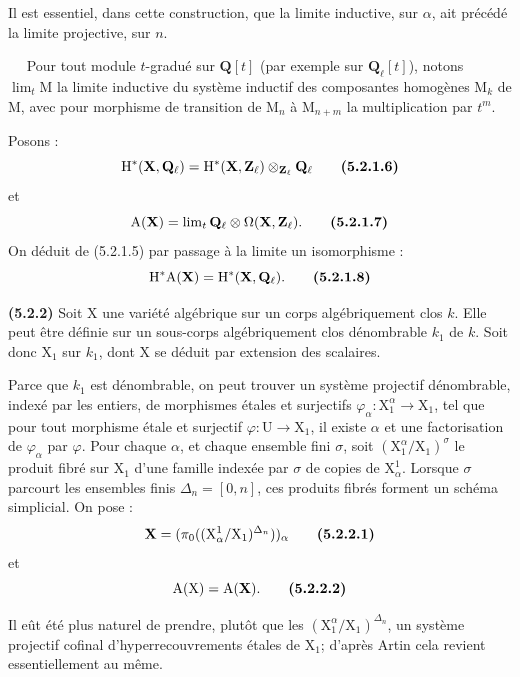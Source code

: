 \documentclass[11pt,leqno]{article}
\newcommand{\Page}[1]{\ifvmode\noindent\else\unskip\ \fi{\footnotesize\textcolor{gray}{[p.\,#1]}}\ \ignorespaces}
\begin{document}
Il est essentiel, dans cette construction, que la limite inductive, sur \(\alpha\), ait précédé la limite projective, sur \(n\).

\Page{238}
Pour tout module \(t\)-gradué sur \(\mathbf{Q}[t]\) (par exemple sur \(\mathbf{Q}_{\ell}[t]\)), notons \(\lim\nolimits_t\mathrm{M}\) la limite inductive du système inductif des composantes homogènes \(\mathrm{M}_k\) de \(\mathrm{M}\), avec pour morphisme de transition de \(\mathrm{M}_n\) à \(\mathrm{M}_{n+m}\) la multiplication par \(t^m\).

Posons :
\[
\mathrm{H}^*(\mathbf{X},\mathbf{Q}_{\ell})
=\mathrm{H}^*(\mathbf{X},\mathbf{Z}_{\ell})
\otimes_{\mathbf{Z}_{\ell}}\mathbf{Q}_{\ell}
\tag*{\textbf{(5.2.1.6)}}
\]
et
\[
\mathrm{A}(\mathbf{X})
=\lim\nolimits_t\mathbf{Q}_{\ell}\otimes\Omega(\mathbf{X},\mathbf{Z}_{\ell}).
\tag*{\textbf{(5.2.1.7)}}
\]
On déduit de (5.2.1.5) par passage à la limite un isomorphisme :
\[
\mathrm{H}^*\mathrm{A}(\mathbf{X})=\mathrm{H}^*(\mathbf{X},\mathbf{Q}_{\ell}).
\tag*{\textbf{(5.2.1.8)}}
\]

\textbf{(5.2.2)} Soit \(\mathrm{X}\) une variété algébrique sur un corps algébriquement clos \(k\). Elle peut être définie sur un sous-corps algébriquement clos dénombrable \(k_1\) de \(k\). Soit donc \(\mathrm{X}_1\) sur \(k_1\), dont \(\mathrm{X}\) se déduit par extension des scalaires.

Parce que \(k_1\) est dénombrable, on peut trouver un système projectif dénombrable, indexé par les entiers, de morphismes étales et surjectifs \(\varphi_{\alpha}:\mathrm{X}_1^{\alpha}\to\mathrm{X}_1\), tel que pour tout morphisme étale et surjectif \(\varphi:\mathrm{U}\to\mathrm{X}_1\), il existe \(\alpha\) et une factorisation de \(\varphi_{\alpha}\) par \(\varphi\). Pour chaque \(\alpha\), et chaque ensemble fini \(\sigma\), soit \((\mathrm{X}_1^{\alpha}/\mathrm{X}_1)^{\sigma}\) le produit fibré sur \(\mathrm{X}_1\) d’une famille indexée par \(\sigma\) de copies de \(\mathrm{X}_{\alpha}^{1}\). Lorsque \(\sigma\) parcourt les ensembles finis \(\Delta_n=[0,n]\), ces produits fibrés forment un schéma simplicial. On pose :
\[
\mathbf{X}=(\pi_0((\mathrm{X}_{\alpha}^{1}/\mathrm{X}_1)^{\Delta_n}))_{\alpha}
\tag*{\textbf{(5.2.2.1)}}
\]
et
\[
\mathrm{A}(\mathrm{X})=\mathrm{A}(\mathbf{X}).
\tag*{\textbf{(5.2.2.2)}}
\]

Il eût été plus naturel de prendre, plutôt que les \((\mathrm{X}_1^{\alpha}/\mathrm{X}_1)^{\Delta_n}\), un système projectif cofinal d’hyperrecouvrements étales de \(\mathrm{X}_1\); d’après Artin cela revient essentiellement au même.
\end{document}
